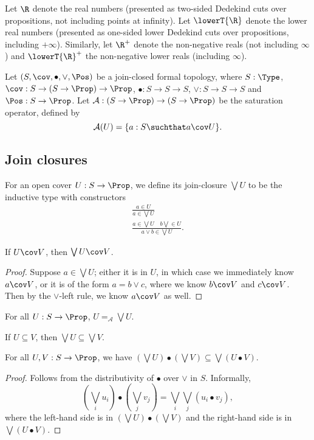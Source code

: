 Let $\R$ denote the real numbers (presented as two-sided Dedekind cuts over propositions, not including points at infinity). Let $\lowerT{\R}$ denote the lower real numbers (presented as one-sided lower Dedekind cuts over propositions, including $+\infty$). Similarly, let $\R^+$ denote the non-negative reals (not including $\infty$) and $\lowerT{\R}^+$ the non-negative lower reals (including $\infty$).

Let $(S, \cov, \bullet, \vee, \Pos)$ be a join-closed formal topology, where $S : \Type$, $\cov : S \to (S \to \Prop) \to \Prop$, $\bullet : S \to S \to S$, $\vee : S \to S \to S$ and $\Pos : S \to \Prop$. Let $\mathcal{A} : (S \to \Prop) \to (S \to \Prop)$ be the saturation operator, defined by
\[
\mathcal{A}(U) = \{ a : S \suchthat a \cov U\}.
\]

\subsection{Join closures}
For an open cover $U : S \to \Prop$, we define its join-closure $\bigvee U$ to be the inductive type with constructors
\begin{gather*}
\frac
{a \in U}
{a \in \bigvee U}
\tag{$\bigvee$-refl}
\\
\frac
{a \in \bigvee U \quad b \bigvee \in U}
{a \vee b \in \bigvee U}.
\tag{$\bigvee$-join}
\end{gather*}

\begin{lemma}
\label{bigvee-cov}
If $U \cov V$, then $\bigvee U \cov V$.
\end{lemma}
\begin{proof}
Suppose $a \in \bigvee U$; either it is in $U$, in which case we immediately know $a \cov V$, or it is of the form $a = b \vee c$, where we know $b \cov V$ and $c \cov V$. Then by the $\vee$-left rule, we know $a \cov V$ as well.
\end{proof}

\begin{corrolary}
For all $U : S \to \Prop$, $U =_\mathcal{A} \bigvee U$.
\end{corrolary}

\begin{lemma}
\label{bigvee-subset}
If $U \subseteq V$, then $\bigvee U \subseteq \bigvee V$.
\end{lemma}

\begin{lemma}
\label{bigvee-distr}
For all $U, V : S \to \Prop$, we have $(\bigvee U) \bullet (\bigvee V) \subseteq \bigvee (U \bullet V)$.
\end{lemma}
\begin{proof}
Follows from the distributivity of $\bullet$ over $\vee$ in $S$. Informally,
\[ 
(\bigvee_i u_i) \bullet (\bigvee_j v_j)
= \bigvee_i \bigvee_j (u_i \bullet v_j),
\]
where the left-hand side is in $(\bigvee U) \bullet (\bigvee V)$ and the right-hand side is in $\bigvee (U \bullet V)$.
\end{proof}

